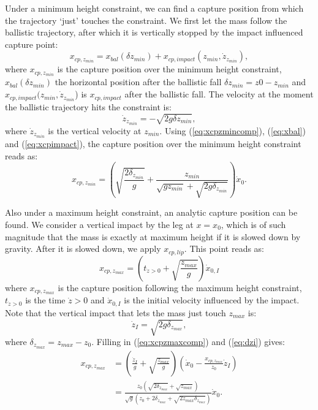 \documentclass[letterpaper, 10 pt, conference]{ieeeconf}  %
\newcommand{\zmin}{z_{min}}
\newcommand{\zmax}{z_{max}}
\begin{document}
Under a minimum height constraint, we can find a capture position from which the trajectory `just' touches the constraint. We first let the mass follow the ballistic trajectory, after which it is vertically stopped by the impact influenced capture point:
\begin{equation}
	x_{cp,\zmin} = x_{bal}(\delta \zmin) + x_{cp,impact}(\zmin, \dot{z}_{\zmin}),
	\label{eq:xcpzmincomp}
\end{equation}
where $x_{cp,\zmin}$ is the capture position over the minimum height constraint, $x_{bal}(\delta \zmin)$ the horizontal position after the ballistic fall $\delta \zmin = z0-\zmin$ and $x_{cp,impact}(\zmin,\dot{z}_{\zmin}$) is $x_{cp,impact}$ after the ballistic fall. The velocity at the moment the ballistic trajectory hits the constraint is:
\begin{equation}
	\dot{z}_{\zmin} = -\sqrt{2g\delta \zmin},
\end{equation}
where $\dot{z}_{\zmin}$ is the vertical velocity at $z_{min}$. Using (\ref{eq:xcpzmincomp}), (\ref{eq:xbal}) and (\ref{eq:xcpimpact}), the capture position over the minimum height constraint reads as:
\begin{equation}
	x_{cp,\zmin} = (\sqrt{\frac{2\delta_{z_{min}}}{g}} + \frac{\zmin}{\sqrt{g \zmin}+\sqrt{2g\delta_{\zmin}}})\dot{x}_0.
\end{equation}

Also under a maximum height constraint, an analytic capture position can be found. We consider a vertical impact by the leg at $x=x_0$, which is of such magnitude that the mass is exactly at maximum height if it is slowed down by gravity. After it is slowed down, we apply $x_{cp,lip}$. This point reads as:
\begin{equation}
	x_{cp,\zmax} =(t_{\dot{z}>0} + \sqrt{\frac{\zmax}{g}})\dot{x}_{0,I}
	\label{eq:xcpzmaxcomp}
\end{equation} 
where $x_{cp,\zmax}$ is the capture position following the maximum height constraint, $t_{\dot{z}>0}$ is the time $\dot{z}>0$ and $\dot{x}_{0,I}$ is the initial velocity influenced by the impact. Note that the vertical impact that lets the mass just touch $\zmax$ is:
\begin{equation}
	\dot{z}_{I} = \sqrt{2g\delta_{\zmax}},
	\label{eq:dzi}
\end{equation}
where $\delta_{\zmax}=\zmax-z_0$. Filling in (\ref{eq:xcpzmaxcomp}) and (\ref{eq:dzi}) gives:
\begin{align}
	x_{cp,\zmax} &= (\frac{\dot{z}_I}{g}+\sqrt{\frac{\zmax}{g}})(\dot{x}_0-\frac{x_{cp,\zmax}}{z_0}\dot{z}_I)\\
	&=\frac{z_0(\sqrt{2\delta_{\zmax}}+\sqrt{\zmax})}{\sqrt{g}(z_0 + 2\delta_{\zmax} + \sqrt{2\zmax \delta_{\zmax}})}\dot{x}_0.
\end{align}
\end{document}
